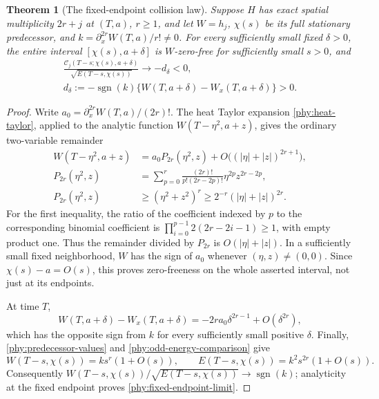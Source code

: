 \documentclass[11pt]{article}
\numberwithin{equation}{section}
\newtheorem{theorem}{Theorem}[section]
\theoremstyle{definition}
\theoremstyle{remark}
\begin{document}
\begin{theorem}[The fixed-endpoint collision law]
\label{phy:fixed-endpoint-chord}
Suppose $H$ has exact spatial multiplicity $2r+j$ at $(T,a)$,
$r\ge1$, and let $W=h_j$, $\chi(s)$ be its full stationary predecessor,
and $k=\partial_x^{2r}W(T,a)/r!\ne0$.  For every sufficiently small
fixed $\delta>0$, the entire interval $[\chi(s),a+\delta]$ is
$W$-zero-free for sufficiently small $s>0$, and
\begin{equation}
 \begin{gathered}
 \boxed{\frac{\mathcal C_j(T-s;\chi(s),a+\delta)}
 {\sqrt{E(T-s,\chi(s))}}\longrightarrow-d_\delta<0,}\\
 d_\delta:=-\operatorname{sgn}(k)
       \{W(T,a+\delta)-W_x(T,a+\delta)\}>0.
 \end{gathered}
 \label{phy:fixed-endpoint-limit}
\end{equation}
\end{theorem}
\begin{proof}
Write $a_0=\partial_x^{2r}W(T,a)/(2r)!$.  The heat Taylor expansion
\eqref{phy:heat-taylor}, applied to the analytic function
$W(T-\eta^2,a+z)$, gives the ordinary two-variable remainder
\begin{align}
 W(T-\eta^2,a+z)
 &=a_0P_{2r}(\eta^2,z)
   +O\bigl((|\eta|+|z|)^{2r+1}\bigr),\label{phy:fixed-neighborhood-profile}\\
 P_{2r}(\eta^2,z)
 &=\sum_{p=0}^r\frac{(2r)!}{p!(2r-2p)!}
       \eta^{2p}z^{2r-2p},\nonumber\\
 P_{2r}(\eta^2,z)&\ge(\eta^2+z^2)^r
 \ge2^{-r}(|\eta|+|z|)^{2r}.\label{phy:positive-heat-polynomial}
\end{align}
For the first inequality, the ratio of the coefficient indexed by $p$
to the corresponding binomial coefficient is
$\prod_{i=0}^{p-1}2(2r-2i-1)\ge1$, with empty product one.
Thus the remainder divided by $P_{2r}$ is $O(|\eta|+|z|)$.
In a sufficiently small fixed neighborhood, $W$ has the sign of $a_0$
whenever $(\eta,z)\ne(0,0)$.  Since $\chi(s)-a=O(s)$, this proves
zero-freeness on the whole asserted interval, not just at its endpoints.

At time $T$,
\[
 W(T,a+\delta)-W_x(T,a+\delta)
 =-2r a_0\delta^{2r-1}+O(\delta^{2r}),
\]
which has the opposite sign from $k$ for every sufficiently small
positive $\delta$.  Finally,
\eqref{phy:predecessor-values} and \eqref{phy:odd-energy-comparison} give
\begin{equation}
 W(T-s,\chi(s))=ks^r(1+O(s)),\qquad
 E(T-s,\chi(s))=k^2s^{2r}(1+O(s)).
 \label{phy:chord-start-energy}
\end{equation}
Consequently $W(T-s,\chi(s))/\sqrt{E(T-s,\chi(s))}\to\operatorname{sgn}(k)$;
analyticity at the fixed endpoint proves \eqref{phy:fixed-endpoint-limit}.
\end{proof}
\end{document}
